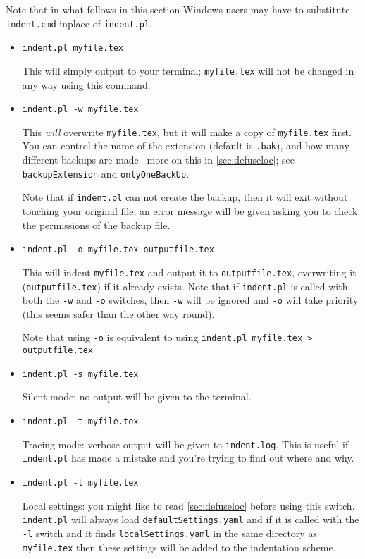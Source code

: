 	Note that in what follows in this section Windows users may have to substitute
 	\lstinline!indent.cmd! inplace of \lstinline!indent.pl!.
 	\begin{itemize}
 		\item[] \lstinline!indent.pl myfile.tex!
 		 					
 		This will simply output to your terminal; \lstinline!myfile.tex! will
 		not be changed in any way using this command. 
 		\item[\verbitem{-w}] \lstinline!indent.pl -w myfile.tex!
 		 					
 		This \emph{will} overwrite \lstinline!myfile.tex!, but it will
 		make a copy of \lstinline!myfile.tex! first. You can control the name of 
 		the extension (default is \lstinline!.bak!), and how many different backups are made-- 
 		more on this in \cref{sec:defuseloc}; see \lstinline!backupExtension! and \lstinline!onlyOneBackUp!.
 		 					
 		Note that if \lstinline!indent.pl! can not create the backup, then it 
 		will exit without touching your original file; an error message will be given
 		asking you to check the permissions of the backup file.
 		\item[\verbitem{-o}] \lstinline!indent.pl -o myfile.tex outputfile.tex!
 		 					
 		This will indent \lstinline!myfile.tex! and output it to \lstinline!outputfile.tex!, 
 		overwriting it (\lstinline!outputfile.tex!) if it already exists. Note that if \lstinline!indent.pl! is called with both
 		the \lstinline!-w! and \lstinline!-o! switches, then \lstinline!-w! will
 		be ignored and \lstinline!-o! will take priority (this seems safer than the 
 		other way round).
 		 					
 		Note that using \lstinline!-o! is equivalent to using \lstinline!indent.pl myfile.tex > outputfile.tex!
 		\item[\verbitem{-s}] \lstinline!indent.pl -s myfile.tex!
 		 					
 		Silent mode: no output will be given to the terminal.
 		\item[\verbitem{-t}] \lstinline!indent.pl -t myfile.tex!
 		 					
 		Tracing mode: verbose output will be given to \lstinline!indent.log!. This 
 		is useful if \lstinline!indent.pl! has made a mistake and you're
 		trying to find out where and why.
 		\item[\verbitem{-l}] \lstinline!indent.pl -l myfile.tex!
 		 					
 		\label{page:localswitch}
 		Local settings: you might like to read \cref{sec:defuseloc} before 
 		using this switch. \lstinline!indent.pl! will always load \lstinline!defaultSettings.yaml!
 		and if it is called with the \lstinline!-l! switch and it finds \lstinline!localSettings.yaml! 
 		in the same directory as \lstinline!myfile.tex! then these settings will be 
 		added to the indentation scheme.
 	\end{itemize}
